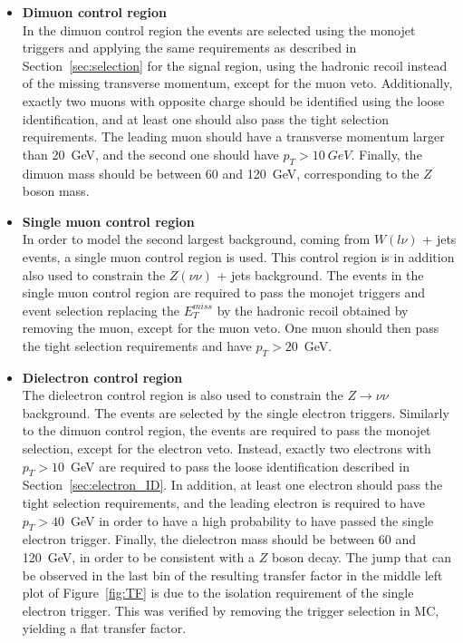 \begin{itemize}
 \item[] \textbf{Dimuon control region}\\ In the dimuon control region the events are selected using the monojet triggers and applying the same requirements as described in Section~\ref{sec:selection} for the signal region, using the hadronic recoil instead of the missing transverse momentum, except for the muon veto. Additionally, exactly two muons with opposite charge should be identified using the loose identification, and at least one should also pass the tight selection requirements. The leading muon should have a transverse momentum larger than \SI{20}{GeV}, and the second one should have $p_T > \SI{10}{GeV}$. Finally, the dimuon mass should be between 60 and \SI{120}{GeV}, corresponding to the $Z$ boson mass.

\item[] \textbf{Single muon control region}\\ In order to model the second largest background, coming from $W(l\nu)$ + jets events, a single muon control region is used. This control region is in addition also used to constrain the $Z(\nu\nu)$ + jets background. The events in the single muon control region are required to pass the monojet triggers and event selection replacing the $E_T^{miss}$ by the hadronic recoil obtained by removing the muon, except for the muon veto. One muon should then pass the tight selection requirements and have $p_T > 20$~GeV.

\item[] \textbf{Dielectron control region}\\ The dielectron control region is also used to constrain the $Z\rightarrow\nu\nu$ background. The events are selected by the single electron triggers. Similarly to the dimuon control region, the events are required to pass the monojet selection, except for the electron veto. Instead, exactly two electrons with $p_T > 10$~GeV are required to pass the loose identification described in Section~\ref{sec:electron_ID}. In addition, at least one electron should pass the tight selection requirements, and the leading electron is required to have $p_T > 40$~GeV in order to have a high probability to have passed the single electron trigger. Finally, the dielectron mass should be between 60 and 120~GeV, in order to be consistent with a $Z$ boson decay. The jump that can be observed in the last bin of the resulting transfer factor in the middle left plot of Figure~\ref{fig:TF} is due to the isolation requirement of the single electron trigger. This was verified by removing the trigger selection in MC, yielding a flat transfer factor.


\end{itemize}
